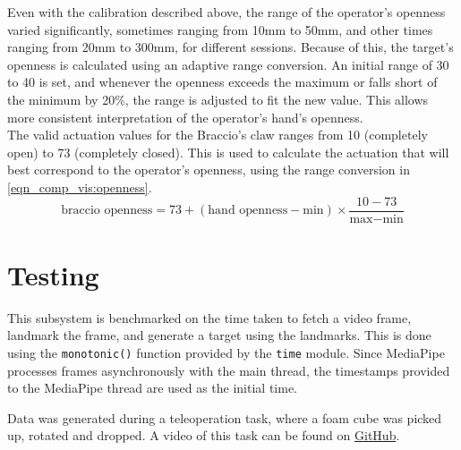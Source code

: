 Even with the calibration described above, the range of the operator's openness varied significantly, sometimes ranging from 10mm to 50mm, and other times ranging from 20mm to 300mm, for different sessions. Because of this, the target's openness is calculated using an adaptive range conversion. An initial range of 30 to 40 is set, and whenever the openness exceeds the maximum or falls short of the minimum by 20\%, the range is adjusted to fit the new value. This allows more consistent interpretation of the operator's hand's openness.\\
The valid actuation values for the Braccio's claw ranges from 10 (completely open) to 73 (completely closed). This is used to calculate the actuation that will best correspond to the operator's openness, using the range conversion in \autoref{eqn_comp_vis:openness}.
\begin{equation}
    \text{braccio openness} = 73+(\text{hand openness}-\text{min})\times\frac{10-73}{\text{max}-\text{min}}
    \label{eqn_comp_vis:openness}
\end{equation}

\section{Testing}
This subsystem is benchmarked on the time taken to fetch a video frame, landmark the frame, and generate a target using the landmarks. This is done using the \verb|monotonic()| function provided by the \verb|time| module. Since MediaPipe processes frames asynchronously with the main thread, the timestamps provided to the MediaPipe thread are used as the initial time.

Data was generated during a teleoperation task, where a foam cube was picked up, rotated and dropped. A video of this task can be found on \href{https://github.com/Neo-Vorsatz-UCT/eee4022s/blob/main/data/EEE4022S_TDR-04_Demo.mp4}{GitHub}.
